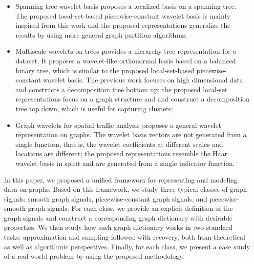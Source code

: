\documentclass[journal,twocolumn,10pt]{IEEEtran}
\theoremstyle{definition}
\begin{document}
\begin{itemize}
\item Spanning tree wavelet basis proposes a localized basis on a spanning tree. The proposed local-set-based piecewise-constant wavelet basis is mainly inspired from this work and the proposed representations generalize the results by using more general graph partition algorithms;

\item Multiscale wavelets on trees provides a hierarchy tree representation for a dataset. It proposes a wavelet-like orthonormal basis based on a balanced binary tree, which is similar to the proposed local-set-based piecewise-constant wavelet basis. The previous work focuses on high dimensional data and constructs a decomposition tree bottom up; the proposed local-set representations focus on a graph structure and and construct a decomposition tree top down, which is
useful for capturing clusters;

\item Graph wavelets for spatial traffic analysis proposes a general wavelet representation on graphs. The wavelet basis vectors are not generated from a single function, that is, the wavelet coefficients at different scales and locations are different; the proposed representations resemble the Haar wavelet basis in spirit and are generated from a single indicator function.
\end{itemize}

In this paper, we proposed a unified framework for representing and modeling data on graphs. Based on this framework, we study three typical classes of graph signals: smooth graph signals, piecewise-constant graph signals, and piecewise-smooth graph signals. For each class, we provide an explicit definition of the graph signals and construct a corresponding graph dictionary with desirable properties. We then study how such graph dictionary works in two standard tasks: approximation and sampling followed with recovery, both from theoretical as well as algorithmic perspectives. Finally, for each class, we present a case study of a real-world problem by using the proposed methodology.



\end{document}
